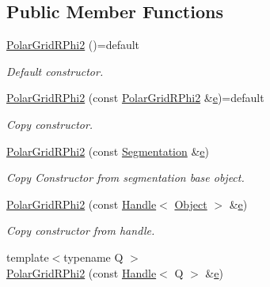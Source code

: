 \subsection*{Public Member Functions}
\begin{DoxyCompactItemize}
\item 
\hyperlink{class_d_d4hep_1_1_geometry_1_1_polar_grid_r_phi2_adc3208e053f06a4adbf8f4fa4544910b}{Polar\+Grid\+R\+Phi2} ()=default
\begin{DoxyCompactList}\small\item\em Default constructor. \end{DoxyCompactList}\item 
\hyperlink{class_d_d4hep_1_1_geometry_1_1_polar_grid_r_phi2_a26204958b319557a5cff82dc61b591e0}{Polar\+Grid\+R\+Phi2} (const \hyperlink{class_d_d4hep_1_1_geometry_1_1_polar_grid_r_phi2}{Polar\+Grid\+R\+Phi2} \&\hyperlink{_volumes_8cpp_a8a9a1f93e9b09afccaec215310e64142}{e})=default
\begin{DoxyCompactList}\small\item\em Copy constructor. \end{DoxyCompactList}\item 
\hyperlink{class_d_d4hep_1_1_geometry_1_1_polar_grid_r_phi2_ae6c860e736ccd4a3b167d3c5d1d32e0d}{Polar\+Grid\+R\+Phi2} (const \hyperlink{class_d_d4hep_1_1_geometry_1_1_segmentation}{Segmentation} \&\hyperlink{_volumes_8cpp_a8a9a1f93e9b09afccaec215310e64142}{e})
\begin{DoxyCompactList}\small\item\em Copy Constructor from segmentation base object. \end{DoxyCompactList}\item 
\hyperlink{class_d_d4hep_1_1_geometry_1_1_polar_grid_r_phi2_aa270f3cab4cb31978e5476dc0db849f3}{Polar\+Grid\+R\+Phi2} (const \hyperlink{class_d_d4hep_1_1_handle}{Handle}$<$ \hyperlink{class_d_d4hep_1_1_geometry_1_1_polar_grid_r_phi2_a1067131b00d726a9739132de2eea6d86}{Object} $>$ \&\hyperlink{_volumes_8cpp_a8a9a1f93e9b09afccaec215310e64142}{e})
\begin{DoxyCompactList}\small\item\em Copy constructor from handle. \end{DoxyCompactList}\item 
{\footnotesize template$<$typename Q $>$ }\\\hyperlink{class_d_d4hep_1_1_geometry_1_1_polar_grid_r_phi2_ac15f62dee34a5d103ad5a765dfe5d5ce}{Polar\+Grid\+R\+Phi2} (const \hyperlink{class_d_d4hep_1_1_handle}{Handle}$<$ Q $>$ \&\hyperlink{_volumes_8cpp_a8a9a1f93e9b09afccaec215310e64142}{e})

\end{DoxyCompactItemize}
